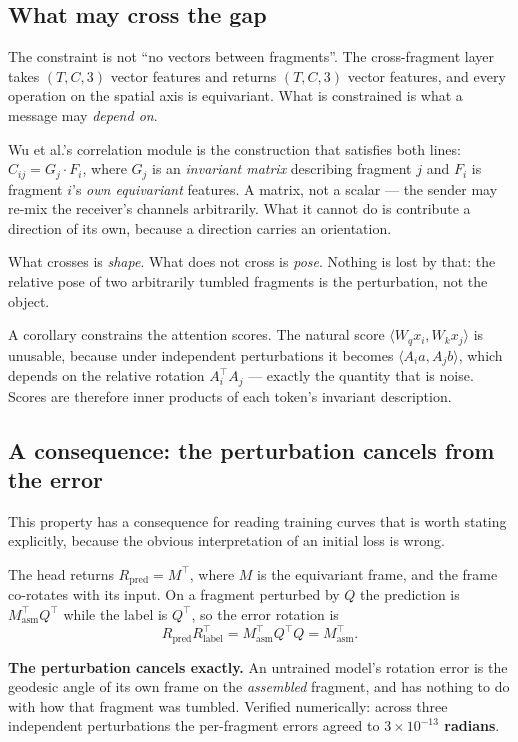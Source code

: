 \documentclass[11pt,a4paper]{report}
\newcommand{\measured}[1]{\textbf{#1}}
\begin{document}
\subsection{What may cross the gap}
\label{sub:crosses}

The constraint is not ``no vectors between fragments''. The cross-fragment layer
takes $(T,C,3)$ vector features and returns $(T,C,3)$ vector features, and every
operation on the spatial axis is equivariant. What is constrained is what a
message may \emph{depend on}.

Wu et al.'s correlation module is the construction that satisfies both lines:
$C_{ij} = G_j \cdot F_i$, where $G_j$ is an \emph{invariant matrix} describing
fragment $j$ and $F_i$ is fragment $i$'s \emph{own equivariant} features. A
matrix, not a scalar --- the sender may re-mix the receiver's channels
arbitrarily. What it cannot do is contribute a direction of its own, because a
direction carries an orientation.

What crosses is \emph{shape}. What does not cross is \emph{pose}. Nothing is
lost by that: the relative pose of two arbitrarily tumbled fragments is the
perturbation, not the object.

A corollary constrains the attention scores. The natural score
$\langle W_q x_i, W_k x_j\rangle$ is unusable, because under independent
perturbations it becomes $\langle A_i a, A_j b\rangle$, which depends on the
relative rotation $A_i^{\top}A_j$ --- exactly the quantity that is noise. Scores
are therefore inner products of each token's invariant description.

\subsection{A consequence: the perturbation cancels from the error}
\label{sub:cancels}

This property has a consequence for reading training curves that is worth
stating explicitly, because the obvious interpretation of an initial loss is
wrong.

The head returns $R_{\text{pred}} = M^{\top}$, where $M$ is the equivariant
frame, and the frame co-rotates with its input. On a fragment perturbed by $Q$
the prediction is $M_{\text{asm}}^{\top} Q^{\top}$ while the label is
$Q^{\top}$, so the error rotation is
\[
R_{\text{pred}} R_{\text{label}}^{\top}
= M_{\text{asm}}^{\top} Q^{\top} Q
= M_{\text{asm}}^{\top}.
\]

\textbf{The perturbation cancels exactly.} An untrained model's rotation error is
the geodesic angle of its own frame on the \emph{assembled} fragment, and has
nothing to do with how that fragment was tumbled. Verified numerically: across
three independent perturbations the per-fragment errors agreed to
\measured{$3\times10^{-13}$ radians}.
\end{document}
